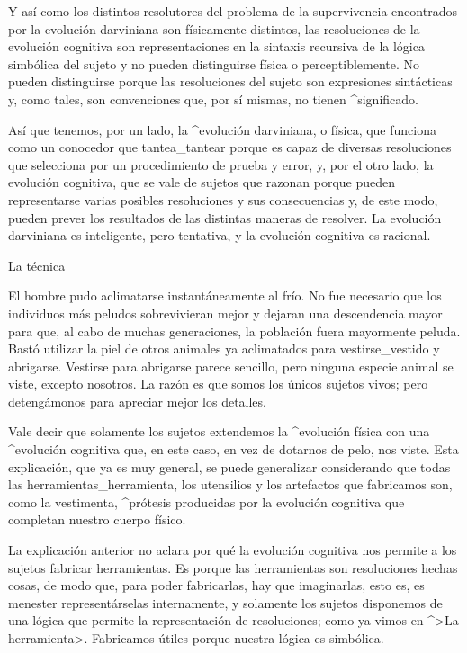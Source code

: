 Y así como los distintos resolutores del problema de la supervivencia
encontrados por la evolución darviniana son físicamente distintos, las
resoluciones de la evolución cognitiva son representaciones en la
sintaxis recursiva de la lógica simbólica del sujeto y no pueden
distinguirse física o perceptiblemente. No pueden distinguirse porque
las resoluciones del sujeto son expresiones sintácticas y, como tales,
son convenciones que, por sí mismas, no tienen ^{significado}.

Así que tenemos, por un lado, la ^{evolución darviniana}, o física, que
funciona como un conocedor que tantea_{tantear} porque es capaz de
diversas resoluciones que selecciona por un procedimiento de prueba y
error, y, por el otro lado, la evolución cognitiva, que se vale de
sujetos que razonan porque pueden representarse varias posibles
resoluciones y sus consecuencias y, de este modo, pueden prever los
resultados de las distintas maneras de resolver. La evolución darviniana
es inteligente, pero tentativa, y la evolución cognitiva es racional.


\Section La técnica

El hombre pudo aclimatarse instantáneamente al frío. No fue necesario
que los individuos más peludos sobrevivieran mejor y dejaran una
descendencia mayor para que, al cabo de muchas generaciones, la
población fuera mayormente peluda. Bastó utilizar la piel de otros
animales ya aclimatados para vestirse_{vestido} y abrigarse. Vestirse
para abrigarse parece sencillo, pero ninguna especie animal se viste,
excepto nosotros. La razón es que somos los únicos sujetos vivos; pero
detengámonos para apreciar mejor los detalles.

Vale decir que solamente los sujetos extendemos la ^{evolución física}
con una ^{evolución cognitiva} que, en este caso, en vez de dotarnos de
pelo, nos viste. Esta explicación, que ya es muy general, se puede
generalizar considerando que todas las herramientas_{herramienta}, los
utensilios y los artefactos que fabricamos son, como la vestimenta,
^{prótesis} producidas por la evolución cognitiva que completan nuestro
cuerpo físico.

La explicación anterior no aclara por qué la evolución cognitiva nos
permite a los sujetos fabricar herramientas. Es porque las herramientas
son resoluciones hechas cosas, de modo que, para poder fabricarlas, hay
que imaginarlas, esto es, es menester representárselas internamente, y
solamente los sujetos disponemos de una lógica que permite la
representación de resoluciones; como ya vimos en ^>La herramienta>.
Fabricamos útiles porque nuestra lógica es simbólica.

